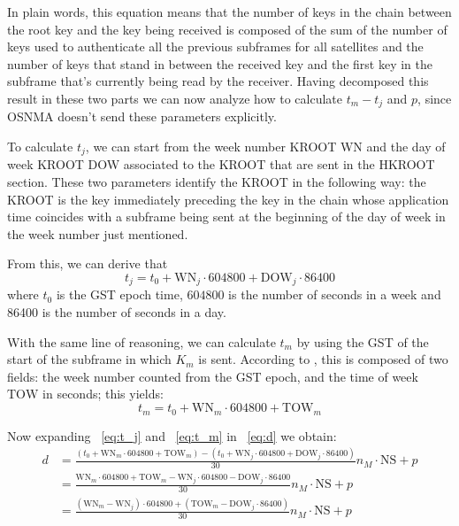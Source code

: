 In plain words, this equation means that the number of keys in the chain between
the root key and the key being received is composed of the sum of the number of
keys used to authenticate all the previous subframes for all satellites and the
number of keys that stand in between the received key and the first key in the
subframe that's currently being read by the receiver.
Having decomposed this result in these two parts we can now analyze how to
calculate $t_m - t_j$ and $p$, since OSNMA doesn't send these parameters
explicitly.

To calculate $t_j$, we can start from the week number \textrm{KROOT WN} and the
day of week \textrm{KROOT DOW} associated to the KROOT that are sent in the
HKROOT section. These two parameters identify the KROOT in the following way:
the KROOT is the key immediately preceding the key in the chain whose
application time coincides with a subframe being sent at the beginning of the
day of week in the week number just mentioned.

From this, we can derive that
\begin{equation}
  \label{eq:t_j}
  t_j = t_0 + \textrm{WN}_j \cdot 604800 + \textrm{DOW}_j \cdot 86400
\end{equation}
where $t_0$ is the GST epoch time, $604800$ is the number of seconds in a week
and 86400 is the number of seconds in a day.

With the same line of reasoning, we can calculate $t_m$ by using the GST of the
start of the subframe in which $K_m$ is sent. According to \cite{galileoicd},
this is composed of two fields: the week number counted from the GST epoch, and
the time of week $\textrm{TOW}$ in seconds; this yields:
\begin{equation}
  \label{eq:t_m}
  t_m = t_0 + \textrm{WN}_m \cdot 604800 + \textrm{TOW}_m
\end{equation}

Now expanding ~\ref{eq:t_j} and ~\ref{eq:t_m} in ~\ref{eq:d} we obtain:
\begin{equation}
  \label{eq:d2}
  \begin{aligned}
    d &= \frac{(t_0 + \textrm{WN}_m \cdot 604800 + \textrm{TOW}_m) - (t_0 +
    \textrm{WN}_j \cdot 604800 + \textrm{DOW}_j \cdot 86400)}{30} n_M \cdot
    \textrm{NS} + p \\
    &= \frac{\textrm{WN}_m \cdot 604800 + \textrm{TOW}_m - \textrm{WN}_j \cdot
    604800 - \textrm{DOW}_j \cdot 86400}{30} n_M \cdot \textrm{NS} + p \\
    &= \frac{(\textrm{WN}_m - \textrm{WN}_j) \cdot 604800 + (\textrm{TOW}_m -
    \textrm{DOW}_j \cdot 86400)}{30} n_M \cdot \textrm{NS} + p
  \end{aligned}
\end{equation}

